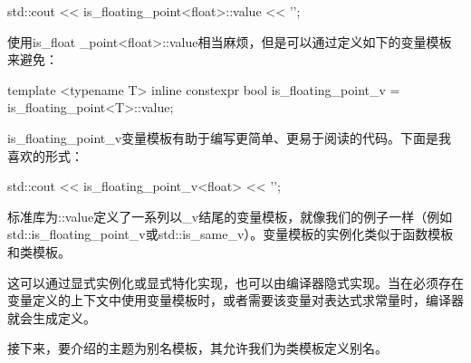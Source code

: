 \begin{cpp}
std::cout << is_floating_point<float>::value << '\n';
\end{cpp}

使用is\_float \_point<float>::value相当麻烦，但是可以通过定义如下的变量模板来避免：

\begin{cpp}
template <typename T>
inline constexpr bool is_floating_point_v =
	is_floating_point<T>::value;
\end{cpp}

is\_floating\_point\_v变量模板有助于编写更简单、更易于阅读的代码。下面是我喜欢的形式：

\begin{cpp}
std::cout << is_floating_point_v<float> << '\n';
\end{cpp}

标准库为::value定义了一系列以\_v结尾的变量模板，就像我们的例子一样（例如std::is\_floating\_point\_v或std::is\_same\_v）。变量模板的实例化类似于函数模板和类模板。

这可以通过显式实例化或显式特化实现，也可以由编译器隐式实现。当在必须存在变量定义的上下文中使用变量模板时，或者需要该变量对表达式求常量时，编译器就会生成定义。

接下来，要介绍的主题为别名模板，其允许我们为类模板定义别名。








